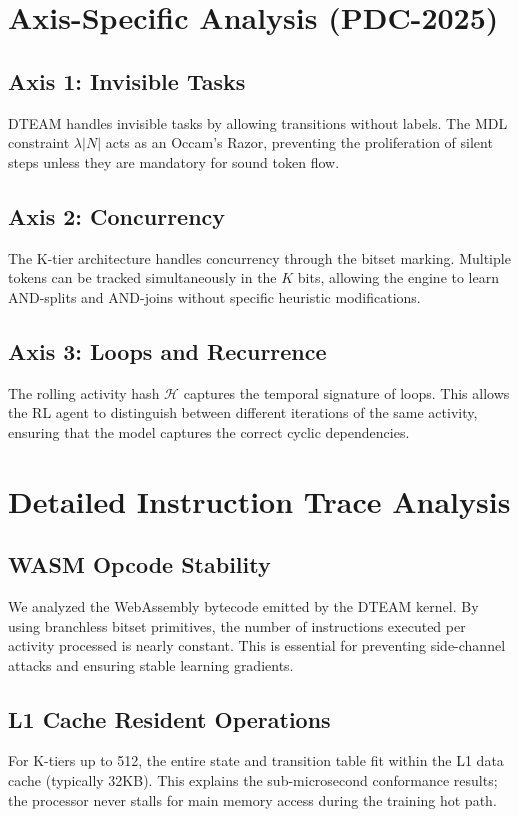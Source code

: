\documentclass[12pt,a4paper]{report}
\begin{document}
\chapter{Axis-Specific Analysis (PDC-2025)}
\section{Axis 1: Invisible Tasks}
DTEAM handles invisible tasks by allowing transitions without labels. The MDL constraint $\lambda |N|$ acts as an Occam's Razor, preventing the proliferation of silent steps unless they are mandatory for sound token flow.

\section{Axis 2: Concurrency}
The K-tier architecture handles concurrency through the bitset marking. Multiple tokens can be tracked simultaneously in the $K$ bits, allowing the engine to learn AND-splits and AND-joins without specific heuristic modifications.

\section{Axis 3: Loops and Recurrence}
The rolling activity hash $\mathcal{H}$ captures the temporal signature of loops. This allows the RL agent to distinguish between different iterations of the same activity, ensuring that the model captures the correct cyclic dependencies.

\chapter{Detailed Instruction Trace Analysis}
\section{WASM Opcode Stability}
We analyzed the WebAssembly bytecode emitted by the DTEAM kernel. By using branchless bitset primitives, the number of instructions executed per activity processed is nearly constant. This is essential for preventing side-channel attacks and ensuring stable learning gradients.

\section{L1 Cache Resident Operations}
For K-tiers up to 512, the entire state and transition table fit within the L1 data cache (typically 32KB). This explains the sub-microsecond conformance results; the processor never stalls for main memory access during the training hot path.
\end{document}
